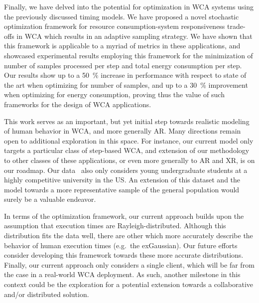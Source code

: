 Finally, we have delved into the potential for optimization in \ac{WCA} systems using the previously discussed timing models.
We have proposed a novel stochastic optimization framework for resource consumption-system responsiveness trade-offs in \ac{WCA} which results in an adaptive sampling strategy. 
We have shown that this framework is applicable to a myriad of metrics in these applications, and showcased experimental results employing this framework for the minimization of number of samples processed per step and total energy consumption per step.
Our results show up to a \SI{50}{\percent} increase in performance with respect to state of the art when optimizing for number of samples, and up to a \SI{30}{\percent} improvement when optimizing for energy consumption, proving thus the value of such frameworks for the design of \ac{WCA} applications.

This work serves as an important, but yet initial step towards realistic modeling of human behavior in \ac{WCA}, and more generally \ac{AR}.
Many directions remain open to additional exploration in this space.
For instance, our current model only targets a particular class of step-based \ac{WCA}, and extension of our methodology to other classes of these applications, or even more generally to \ac{AR} and \ac{XR}, is on our roadmap.
Our data~\cite{olguinmunoz:impact2021} also only considers young undergraduate students at a highly competitive university in the US.\@
An extension of this dataset and the model towards a more representative sample of the general population would surely be a valuable endeavor.

In terms of the optimization framework, our current approach builds upon the assumption that execution times are Rayleigh-distributed.
Although this distribution fits the data well, there are other which more accurately describe the behavior of human execution times (e.g.\ the \acl{exGaussian}).
Our future efforts consider developing this framework towards these more accurate distributions.
Finally, our current approach only considers a single client, which will be far from the case in a real-world \ac{WCA} deployment.
As such, another milestone in this context could be the exploration for a potential extension towards a collaborative and/or distributed solution.